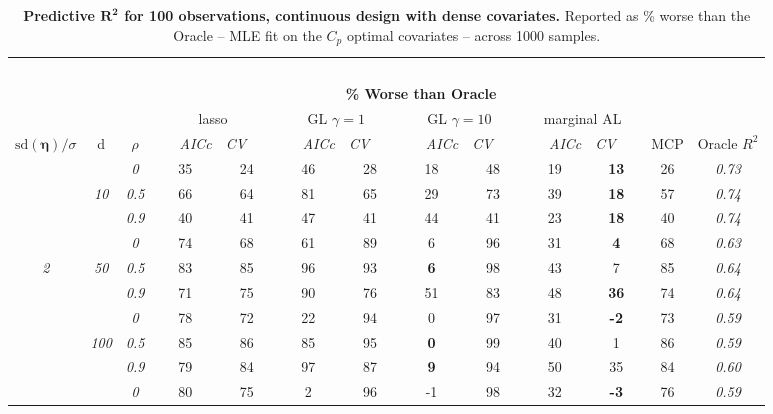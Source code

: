 \begin{table}
\vspace{-.2cm}
\footnotesize
\caption{ 
	{\bf  Predictive $\boldsymbol{R^2}$ for 100 observations, 
	continuous design with dense covariates.}
  Reported as  \% worse than the Oracle 
  -- MLE fit on the $C_p$ optimal covariates -- 
  across 1000 samples.}
\begin{center}
\begin{tabular}{ccc|cc|cc|cc|cc|c|c}
\hline &&&\multicolumn{9}{|c|}{~}\\[-1ex]
\multicolumn{3}{c}{~}&\multicolumn{9}{|c|}{\bf \% Worse than Oracle } &   \\[1ex]
& &
& \multicolumn{2}{c}{lasso} 
& \multicolumn{2}{c}{GL $\gamma=1$} 
& \multicolumn{2}{c}{GL $\gamma=10$} 
& \multicolumn{2}{c}{marginal AL} 
& \multicolumn{1}{c|}{~} & \\[-0.5ex]
$\mathrm{sd}(\boldsymbol{\eta})/\sigma$ & {\sf d} & $\rho$ 
& ~~~\scriptsize\it AICc & \multicolumn{1}{c}{\scriptsize\it CV~~~}
& ~~~\scriptsize\it AICc & \multicolumn{1}{c}{\scriptsize\it CV~~~}
& ~~~\scriptsize\it AICc & \multicolumn{1}{c}{\scriptsize\it CV~~~}
& ~~~\scriptsize\it AICc & \multicolumn{1}{c}{\scriptsize\it CV~~~} 
& \multicolumn{1}{c|}{ MCP} & Oracle $R^2$ \\[.5ex]
\hline\rule{0pt}{3ex}
& & \it  0  & 35 & 24 & 46 & 28 & 18 & 48 & 19 & {\bf 13} & 26 & \it  0.73 \\
 & \it  10  & \it  0.5  & 66 & 64 & 81 & 65 & 29 & 73 & 39 & {\bf 18} & 57 & \it  0.74 \\
& & \it  0.9  & 40 & 41 & 47 & 41 & 44 & 41 & 23 & {\bf 18} & 40 & \it  0.74 \\[1ex]
\cline{2-3}\rule{0pt}{3ex}
& & \it  0  & 74 & 68 & 61 & 89 & 6 & 96 & 31 & {\bf 4} & 68 & \it  0.63 \\
\it  2  & \it  50  & \it  0.5  & 83 & 85 & 96 & 93 & {\bf 6} & 98 & 43 & 7 & 85 & \it  0.64 \\
& & \it  0.9  & 71 & 75 & 90 & 76 & 51 & 83 & 48 & {\bf 36} & 74 & \it  0.64 \\[1ex]
\cline{2-3}\rule{0pt}{3ex}
& & \it  0  & 78 & 72 & 22 & 94 & 0 & 97 & 31 & {\bf -2} & 73 & \it  0.59 \\
 & \it  100  & \it  0.5  & 85 & 86 & 85 & 95 & {\bf 0} & 99 & 40 & 1 & 86 & \it  0.59 \\
& & \it  0.9  & 79 & 84 & 97 & 87 & {\bf 9} & 94 & 50 & 35 & 84 & \it  0.60 \\[1ex]
\cline{2-3}\rule{0pt}{3ex}
& & \it  0  & 80 & 75 & 2 & 96 & -1 & 98 & 32 & {\bf -3} & 76 & \it  0.59 \\

\end{tabular}
\end{center}
\end{table}
